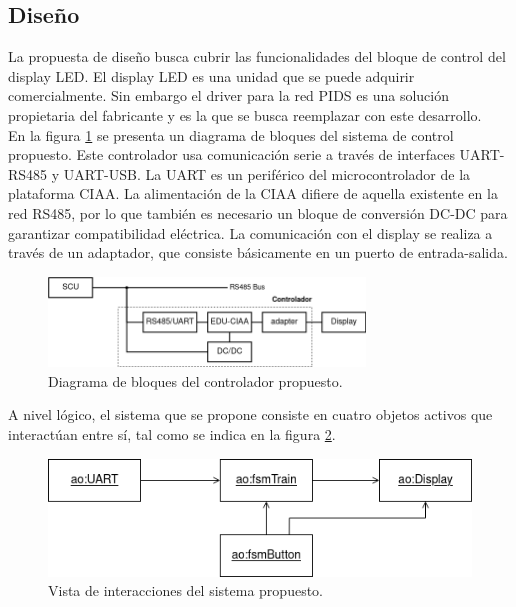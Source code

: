 \subsection{Diseño}
La propuesta de diseño busca cubrir las funcionalidades del bloque de control del display LED. El display LED es una unidad que se puede adquirir comercialmente. Sin embargo el driver para la red PIDS es una solución propietaria del fabricante y es la que se busca reemplazar con este desarrollo.\\

En la figura \ref{fig:diagVistaReDisenhoEduCIAA} se presenta un diagrama de bloques del sistema de control propuesto. Este controlador usa comunicación serie a través de interfaces UART-RS485 y UART-USB. La UART es un periférico del microcontrolador de la plataforma CIAA. La alimentación de la CIAA difiere de aquella existente en la red RS485, por lo que también es necesario un bloque de conversión DC-DC para garantizar compatibilidad eléctrica. La comunicación con el display se realiza a través de un adaptador, que consiste básicamente en un puerto de entrada-salida.\\


\begin{figure}[ht]
	\centering
	\includegraphics[width=0.75\textwidth]{./Figures/diagVistaReDisenhoEduCIAA.png}
	\caption{Diagrama de bloques del controlador propuesto.}
	\label{fig:diagVistaReDisenhoEduCIAA}
\end{figure}

A nivel lógico, el sistema que se propone consiste en cuatro objetos activos que interactúan entre sí, tal como se indica en la figura \ref{fig:diagVistaDisenho}. 

\begin{figure}[ht]
	\centering
	\includegraphics[width=1\textwidth]{./Figures/diagVistaDisenho.png}
	\caption{Vista de interacciones del sistema propuesto.}
	\label{fig:diagVistaDisenho}
\end{figure}

